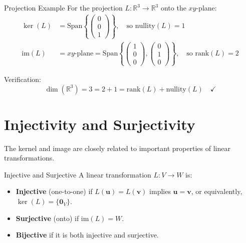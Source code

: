 \documentclass[12pt,a4paper]{article}
\newcommand{\R}{\mathbb{R}}
\newcommand{\vv}[1]{\mathbf{#1}}
\newcommand{\vzero}{\mathbf{0}}
\newcommand{\Span}{\text{Span}}
\newcommand{\rank}{\text{rank}}
\newcommand{\nullity}{\text{nullity}}
\newcommand{\im}{\text{im}}
\begin{document}
	\begin{example}{Projection Example}
		For the projection $L: \R^3 \to \R^3$ onto the $xy$-plane:
		\begin{align*}
			\ker(L) &= \Span\left\{\begin{pmatrix} 0 \\ 0 \\ 1 \end{pmatrix}\right\}, \quad \text{so } \nullity(L) = 1 \\
			\im(L) &= xy\text{-plane} = \Span\left\{\begin{pmatrix} 1 \\ 0 \\ 0 \end{pmatrix}, \begin{pmatrix} 0 \\ 1 \\ 0 \end{pmatrix}\right\}, \quad \text{so } \rank(L) = 2
		\end{align*}
		
		Verification:
		\[
		\dim(\R^3) = 3 = 2 + 1 = \rank(L) + \nullity(L) \quad \checkmark
		\]
	\end{example}
	
	\section{Injectivity and Surjectivity}
	
	The kernel and image are closely related to important properties of linear transformations.
	
	\begin{definition}{Injective and Surjective}
		A linear transformation $L: V \to W$ is:
		\begin{itemize}
			\item \textbf{Injective} (one-to-one) if $L(\vv{u}) = L(\vv{v})$ implies $\vv{u} = \vv{v}$, or equivalently, $\ker(L) = \{\vzero_V\}$.
			\item \textbf{Surjective} (onto) if $\im(L) = W$.
			\item \textbf{Bijective} if it is both injective and surjective.
		\end{itemize}
	\end{definition}
	
\end{document}

